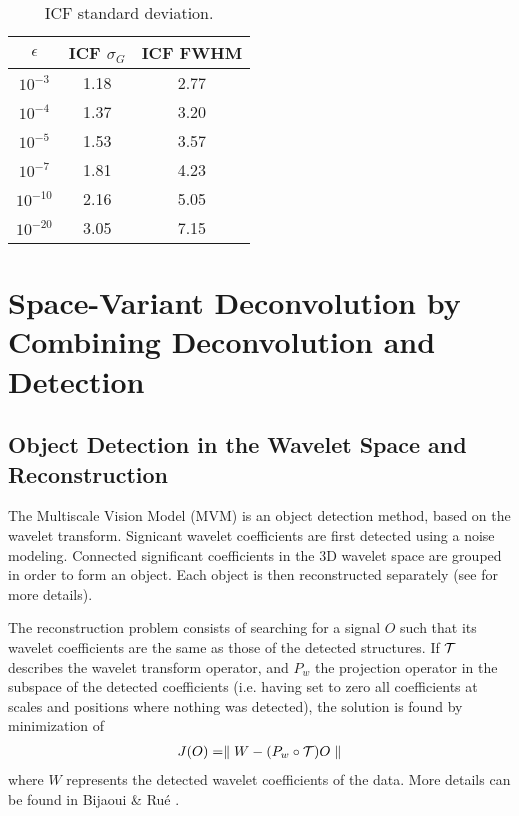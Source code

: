 \documentclass[11pt,a4paper]{article}
\begin{document}
\begin{table}[hbt]
\caption{ICF standard deviation.}
\begin{center}
\begin{tabular}{ccc} \hline \hline
$\epsilon$     & ICF $\sigma_G$  & ICF FWHM       \\ \hline \hline
 $10^{-3}$      & 1.18    &   2.77     \\
$10^{-4} $       & 1.37    &   3.20     \\
$10^{-5} $       & 1.53    &   3.57     \\
$10^{-7} $       & 1.81    &   4.23     \\
$10^{-10}$      & 2.16    &   5.05     \\
$10^{-20}$      & 3.05    &   7.15     \\  \hline \hline
\end{tabular}
\end{center}
\label{comptab}
\end{table}

\section{Space-Variant Deconvolution by Combining Deconvolution and Detection}
\subsection{Object Detection in the Wavelet Space and Reconstruction}
The Multiscale Vision Model (MVM) \cite{ima:bijaoui95,ima:rue97}
is an object  detection method, based on the wavelet transform.
Signicant wavelet coefficients are first detected using a noise modeling.
Connected significant coefficients in the 3D wavelet space 
are grouped in order to form an object. Each object is then reconstructed 
separately (see \cite{starck:book98} for more details). 

The reconstruction problem
consists of searching for a signal $O$ such that
its wavelet coefficients are the same as those of the detected
structures. If $\cal T$ describes the wavelet transform operator, and 
$P_w$ the
projection operator in the subspace of the detected coefficients
(i.e. having set to zero all coefficients at scales and positions where
nothing was  detected), the solution is found by minimization of
\begin{eqnarray*}
J(O) = \parallel W - (P_w \circ {\cal T}) O  \parallel
\end{eqnarray*}
where $W$ represents the detected wavelet coefficients of the data.
More details can be found in Bijaoui \& Ru\'e \cite*{ima:bijaoui95}.
\end{document}
